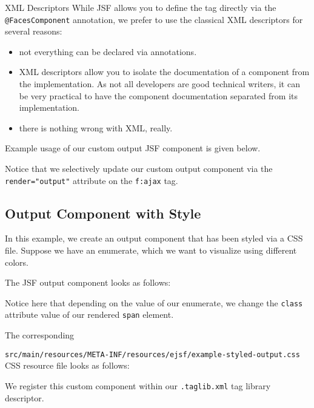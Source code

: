 \begin{TIP}{XML Descriptors}
While JSF allows you to define the tag directly via the \texttt{@FacesComponent} annotation,
we prefer to use the classical XML descriptors for several reasons:
\begin{itemize}
	\item not everything can be declared via annotations.
	\item XML descriptors allow you to isolate the documentation of a component from the implementation.
	As not all developers are good technical writers, it can be very practical to have the component documentation separated from its implementation.
	\item there is nothing wrong with XML, really.
\end{itemize}
\end{TIP}

Example usage of our custom output JSF component is given below.

Notice that we selectively update our custom output component via the \texttt{render="output"} attribute on the \texttt{f:ajax} tag.

\subsection{Output Component with Style}

In this example, we create an output component that has been styled via a CSS file.
Suppose we have an enumerate, which we want to visualize using different colors.


The JSF output component looks as follows:

Notice here that depending on the value of our enumerate, we change the \texttt{class} attribute value of our rendered \texttt{span} element.

The corresponding

\texttt{src/main/resources/META-INF/resources/ejsf/example-styled-output.css} CSS resource file looks as follows:


We register this custom component within our \texttt{.taglib.xml} tag library descriptor.


